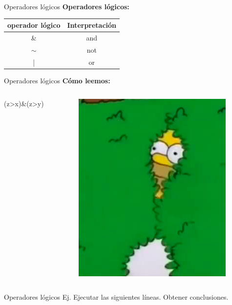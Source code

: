 \documentclass{bredelebeamer}
\begin{document}
\begin{frame}{Operadores lógicos}
\textbf{Operadores lógicos:}
\begin{table}[]
\centering
\begin{tabular}{|c|c|}
\hline
operador lógico & Interpretación \\ \hline
\&              & and            \\ \hline
$\sim$          & not            \\ \hline
|               & or             \\ \hline
\end{tabular}
\end{table}
\end{frame}

\begin{frame}{Operadores lógicos}
\textbf{Cómo leemos:}
\begin{columns}
\begin{column}{0.5\textwidth}
\begin{center}
\Huge (z>x)\&(z>y)
\end{center}
\end{column}
\begin{column}{0.5\textwidth}
\begin{center}
\includegraphics[scale=0.4]{images/img41.png}
\end{center}
\end{column}
\end{columns}
\end{frame}

\begin{frame}{Operadores lógicos}
Ej. Ejecutar las siguientes líneas. Obtener conclusiones.
\end{frame}
\end{document}
